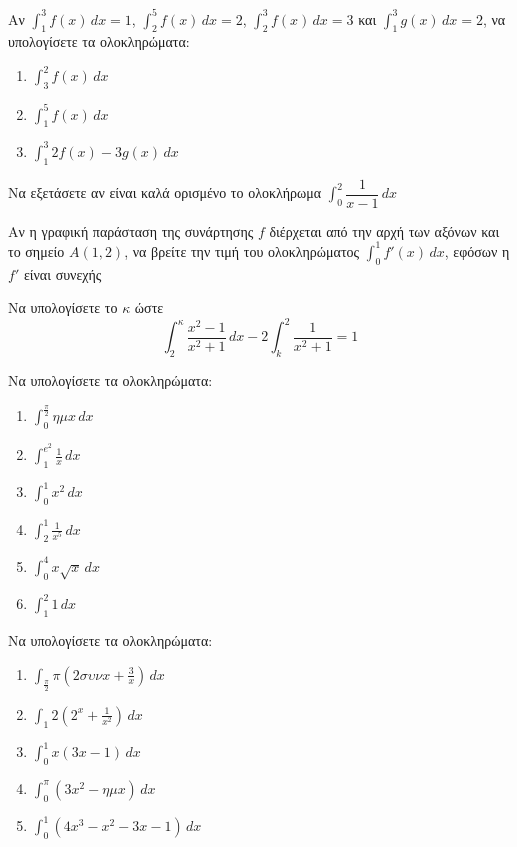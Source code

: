 \documentclass{presentation}
\begin{document}
\begin{askisi}
    Αν $\int_{1}^{3}f(x)\,dx=1$, $\int_{2}^{5}f(x)\,dx=2$, $\int_{2}^{3}f(x)\,dx=3$ και $\int_{1}^{3}g(x)\,dx=2$, να υπολογίσετε τα ολοκληρώματα:
    \begin{enumerate}[<+->]
        \item $\int_{3}^{2}f(x)\,dx$
        \item $\int_{1}^{5}f(x)\,dx$
        \item $\int_{1}^{3}2f(x)-3g(x)\,dx$
    \end{enumerate}
\end{askisi}

\begin{askisi}
    Να εξετάσετε αν είναι καλά ορισμένο το ολοκλήρωμα $\int_{0}^{2}\dfrac{1}{x-1}\, dx$
\end{askisi}

\begin{askisi}
    Αν η γραφική παράσταση της συνάρτησης $f$ διέρχεται από την αρχή των αξόνων και το σημείο $Α(1,2)$, να βρείτε την τιμή του ολοκληρώματος $\int_{0}^{1}f'(x)\,dx$, εφόσων η $f'$ είναι συνεχής
\end{askisi}

\begin{askisi}
    Να υπολογίσετε το $κ$ ώστε
    $$\int_{2}^{κ}\frac{x^2-1}{x^2+1}\, dx-2\int_{k}^{2}\frac{1}{x^2+1}=1$$
\end{askisi}

\begin{askisi}
    Να υπολογίσετε τα ολοκληρώματα:
    \begin{enumerate}[<+->]
        \item $\int_{0}^{\frac{π}{2}}ημx\,dx$
        \item $\int_{1}^{e^2}\frac{1}{x}\,dx$
        \item $\int_{0}^{1}x^2\,dx$
        \item $\int_{2}^{1}\frac{1}{x^5}\,dx$
        \item $\int_{0}^{4}x\sqrt{x}\,dx$
        \item $\int_{1}^{2}1\,dx$
    \end{enumerate}
\end{askisi}

\begin{askisi}
    Να υπολογίσετε τα ολοκληρώματα:
    \begin{enumerate}[<+->]
        \item $\int_{\frac{π}{2}}{π}\left( 2συνx+\frac{3}{x} \right)\,dx$
        \item $\int_{1}{2}\left( 2^x+\frac{1}{x^2} \right)\,dx$
        \item $\int_{0}^{1}x(3x-1)\,dx$
        \item $\int_{0}^{π}(3x^2-ημx)\,dx$
        \item $\int_{0}^{1}(4x^3-x^2-3x-1)\,dx$
    \end{enumerate}
\end{askisi}
\end{document}
